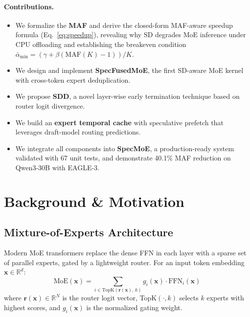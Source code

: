 \documentclass[letterpaper,twocolumn,10pt]{article}
\newcommand{\sysname}{SpecMoE\xspace}
\newcommand{\specfused}{SpecFusedMoE\xspace}
\newcommand{\sdd}{SDD\xspace}
\newcommand{\maf}{MAF\xspace}
\newcommand{\thetabar}{\bar{\alpha}}
\begin{document}
\paragraph{Contributions.}
\begin{itemize}[leftmargin=*,itemsep=1pt]
\item We formalize the \textbf{\maf} and derive the closed-form
  MAF-aware speedup formula (Eq.~\ref{eq:speedup}), revealing why SD
  degrades MoE inference under CPU offloading and establishing the
  breakeven condition $\thetabar_{\min} = (\gamma+\beta(\text{MAF}(K)\!-\!1))/K$.
\item We design and implement \textbf{\specfused}, the first SD-aware MoE
  kernel with cross-token expert deduplication.
\item We propose \textbf{\sdd}, a novel layer-wise early termination
  technique based on router logit divergence.
\item We build an \textbf{expert temporal cache} with speculative
  prefetch that leverages draft-model routing predictions.
\item We integrate all components into \textbf{\sysname}, a
  production-ready system validated with 67 unit tests, and demonstrate
  40.1\% \maf reduction on Qwen3-30B with EAGLE-3.
\end{itemize}

\section{Background \& Motivation}\label{sec:background}

\subsection{Mixture-of-Experts Architecture}\label{sec:moe}

Modern MoE transformers replace the dense FFN in each layer with a sparse
set of parallel experts, gated by a lightweight router.  For an input
token embedding $\mathbf{x}\!\in\!\mathbb{R}^{d}$:
\begin{equation}\label{eq:moe}
 \text{MoE}(\mathbf{x}) = \sum_{i \in \text{TopK}(\mathbf{r}(\mathbf{x}),\, k)} g_i(\mathbf{x}) \cdot \text{FFN}_i(\mathbf{x})
\end{equation}
where $\mathbf{r}(\mathbf{x})\!\in\!\mathbb{R}^N$ is the router logit
vector, TopK$(\cdot, k)$ selects $k$ experts with highest scores, and
$g_i(\mathbf{x})$ is the normalized gating weight.
\end{document}
